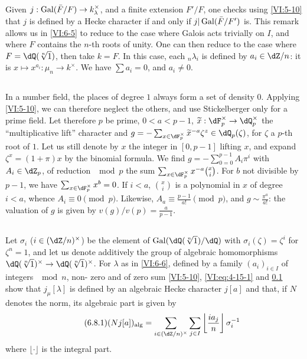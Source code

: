 Given $j:\operatorname{Gal}(\bar F/F) \to k_\lambda^\times$, and a finite extension
$F'/F$, one checks using \ref{VI:5-10} that $j$ is defined by a
Hecke character if and only if $j|\operatorname{Gal}(\bar F/F')$ is. This
remark allows us in \ref{VI:6-5} to reduce to the case where Galois acts
trivially on $I$, and where $F$ contains the $n$-th roots of
unity. One can then reduce to the case where $F=\dQ(\sqrt[n]{1})$, then
take $k=F$. In this case, each $_n \lambda_i$ is defined by
$a_i\in \dZ/n$: it is $x\mapsto x^{a_i}:\mu_n \to k^\times$. We have
$\sum a_i=0$, and $a_i\ne 0$. 





\subsection{}\label{VI:6-7}

In a number field, the places of degree $1$ always form a
set of density $0$. Applying \ref{VI:5-10}, we can therefore neglect
the others, and use Stickelberger only for a prime field. Let therefore
$p$ be prime, $0<a<p-1$, $\widetilde x:\dF_p^\times \to \dQ_p^\times$ the
``multiplicative lift'' character and
$g=-\sum_{x\in \dF_p^\times} \widetilde x^{-a} \zeta^z\in \dQ_p(\zeta)$, for
$\zeta$ a $p$-th root of $1$. Let us still denote by $x$ the integer in $[0,p-1]$
lifting $x$, and expand $\zeta^x=(1+\pi)x$ by the binomial formula.
We find $g=-\sum_{0=0}^{p-1} A_i\pi^i$ with $A_i\in \dZ_p$, of reduction
$\mod p$ the sum $\sum_{x\in \dF_p^\times} x^{-a} \binom x i$. For $b$ not
divisible by $p-1$, we have $\sum_{x\in \dF_p^\times} x^b=0$. If $i<a$,
$\binom x i$ is a polynomial in $x$ of degree $i<a$, whence
$A_i\equiv 0\pmod p$. Likewise, $A_a\equiv \frac{p-1}{a!} \pmod p$, and
$g\sim \frac{\pi^a}{a!}$: the valuation of $g$ is given by
$v(g)/v(p) = \frac{a}{p-1}$. 





\subsection{}\label{VI:6-8}

Let $\sigma_i$ ($i\in (\dZ/n)^\times$) be the element of
$\gal(\dQ(\sqrt[n]{1})/\dQ)$ with $\sigma_i(\zeta)=\zeta^i$ for $\zeta^n=1$,
and let us denote additively the group of algebraic homomorphisms
$\dQ(\sqrt[n]{1})^\times \to \dQ(\sqrt[n]{1})^\times$. For $\lambda$ as in
\ref{VI:6-6}, defined by a family $(a_i)_{i\in I}$ of integers $\mod n$, non-
zero and of zero sum \ref{VI:5-10}, \eqref{VI:eq:4-15-1} and \ref{VI:6-7}
show that $j_\mu[\lambda]$ is defined by an algebraic Hecke
character $j[a]$ and that, if $N$ denotes the norm, its algebraic part is
given by 
\begin{equation*}\tag{6.8.1}\label{VI:eq:6-8-1}
  (N j[a])_\text{alg} = \sum_{i\in (\dZ/n)^\times} \sum_{j\in I} \left \lfloor \frac{i a_j}{n} \right\rfloor \sigma_i^{-1} 
\end{equation*}
where $\lfloor \cdot \rfloor$ is the integral part. 





